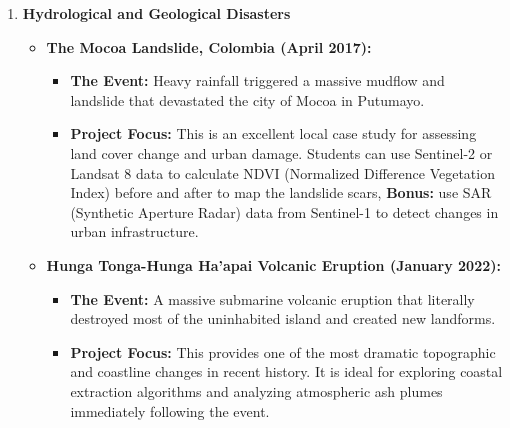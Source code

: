 \documentclass{article}
\begin{document}
\begin{enumerate}
    \item \textbf{Hydrological and Geological Disasters}
    \begin{itemize}
        \item \textbf{The Mocoa Landslide, Colombia (April 2017):}
        \begin{itemize}
            \item \textbf{The Event:} Heavy rainfall triggered a massive mudflow and landslide that devastated the city of Mocoa in Putumayo.
            \item \textbf{Project Focus:} This is an excellent local case study for assessing land cover change and urban damage. Students can use Sentinel-2 or Landsat 8 data to calculate NDVI (Normalized Difference Vegetation Index) before and after to map the landslide scars, \textbf{Bonus:} use SAR (Synthetic Aperture Radar) data from Sentinel-1 to detect changes in urban infrastructure.
        \end{itemize}
        \item \textbf{Hunga Tonga-Hunga Ha'apai Volcanic Eruption (January 2022):}
        \begin{itemize}
            \item \textbf{The Event:} A massive submarine volcanic eruption that literally destroyed most of the uninhabited island and created new landforms.
            \item \textbf{Project Focus:} This provides one of the most dramatic topographic and coastline changes in recent history. It is ideal for exploring coastal extraction algorithms and analyzing atmospheric ash plumes immediately following the event.
        \end{itemize}
    \end{itemize}


\end{enumerate}
\end{document}
